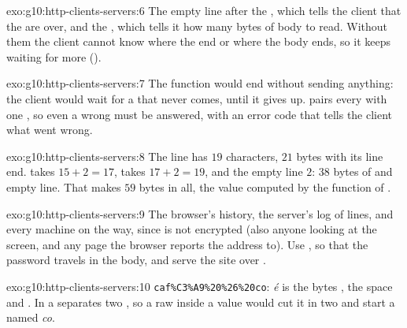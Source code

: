 \begin{solution}{exo:g10:http-clients-servers:6}
The empty line after the , which tells the client that the  are over, and the 
, which tells it how many bytes of body to read. Without them the client cannot know where the  end or
where the body ends, so it keeps waiting for more ().
\end{solution}

\begin{solution}{exo:g10:http-clients-servers:7}
The function would end without sending anything: the client would wait for a  that never comes, until it
gives up.  pairs every  with one , so even a wrong  must be answered, with an error code
that tells the client what went wrong.
\end{solution}

\begin{solution}{exo:g10:http-clients-servers:8}
The  line  has $19$ characters, $21$ bytes with its line end. 
takes $15 + 2 = 17$,  takes $17 + 2 = 19$, and the empty line $2$: $38$ bytes of  and
empty line. That makes $59$ bytes in all, the value computed by the function  of
.
\end{solution}

\begin{solution}{exo:g10:http-clients-servers:9}
The browser's history, the server's log of  lines, and every machine on the way, since  is not
encrypted (also anyone looking at the screen, and any page the browser reports the address to). Use
, so that the password travels in the body, and serve the site over .
\end{solution}

\begin{solution}{exo:g10:http-clients-servers:10}
\texttt{caf\%C3\%A9\%20\%26\%20co}: \textit{é} is the  bytes , the space  and \code{&}
. In a  \code{&} separates two , so a raw \code{&} inside a value would cut it in two
and start a  named \textit{ co}.
\end{solution}

